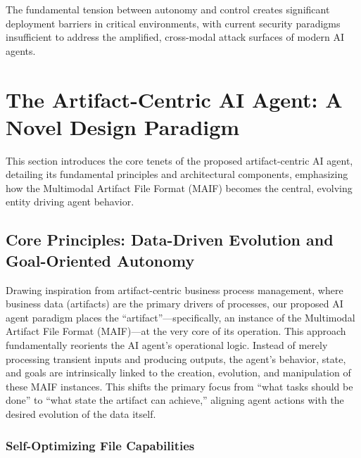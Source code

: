 \documentclass[conference]{IEEEtran}
\begin{document}
The fundamental tension between autonomy and control creates significant deployment barriers in critical environments, with current security paradigms insufficient to address the amplified, cross-modal attack surfaces of modern AI agents.

\section{The Artifact-Centric AI Agent: A Novel Design Paradigm}
\label{sec:artifact-centric}

This section introduces the core tenets of the proposed artifact-centric AI agent, detailing its fundamental principles and architectural components, emphasizing how the Multimodal Artifact File Format (MAIF) becomes the central, evolving entity driving agent behavior.

\subsection{Core Principles: Data-Driven Evolution and Goal-Oriented Autonomy}

Drawing inspiration from artifact-centric business process management, where business data (artifacts) are the primary drivers of processes, our proposed AI agent paradigm places the ``artifact''---specifically, an instance of the Multimodal Artifact File Format (MAIF)---at the very core of its operation\cite{ref10}. This approach fundamentally reorients the AI agent's operational logic. Instead of merely processing transient inputs and producing outputs, the agent's behavior, state, and goals are intrinsically linked to the creation, evolution, and manipulation of these MAIF instances. This shifts the primary focus from ``what tasks should be done'' to ``what state the artifact can achieve,'' aligning agent actions with the desired evolution of the data itself\cite{ref12}.

\subsubsection{Self-Optimizing File Capabilities}
\end{document}

